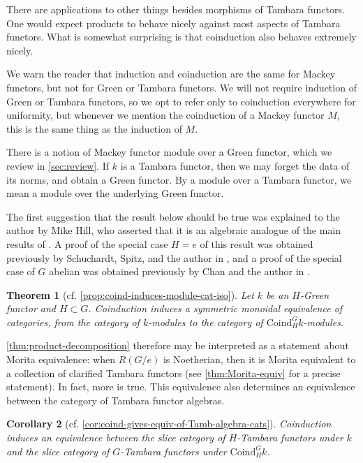 \documentclass[11pt,dvipsnames]{amsart}
\newtheorem{theoremLET}{Theorem}
\newtheorem{corollaryLET}[theoremLET]{Corollary}
\theoremstyle{BoldRemark}
\begin{document}
There are applications to other things besides morphisms of Tambara functors. One would expect products to behave nicely against most aspects of Tambara functors. What is somewhat surprising is that coinduction also behaves extremely nicely.

We warn the reader that induction and coinduction are the same for Mackey functors, but not for Green or Tambara functors. We will not require induction of Green or Tambara functors, so we opt to refer only to coinduction everywhere for uniformity, but whenever we mention the coinduction of a Mackey functor $M$, this is the same thing as the induction of $M$.

There is a notion of Mackey functor module over a Green functor, which we review in \cref{sec:review}. If $k$ is a Tambara functor, then we may forget the data of its norms, and obtain a Green functor. By a module over a Tambara functor, we mean a module over the underlying Green functor. 

The first suggestion that the result below should be true was explained to the author by Mike Hill, who asserted that it is an algebraic analogue of the main results of \cite{BDS15}. A proof of the special case $H = e$ of this result was obtained previously by Schuchardt, Spitz, and the author in \cite{SSW24}, and a proof of the special case of $G$ abelian was obtained previously by Chan and the author in \cite{CW25}.

\begin{theoremLET}[cf. \cref{prop:coind-induces-module-cat-iso}]
	Let $k$ be an $H$-Green functor and $H \subset G$. Coinduction induces a symmetric monoidal equivalence of categories, from the category of $k$-modules to the category of $\mathrm{Coind}_H^G k$-modules.
\end{theoremLET}

\cref{thm:product-decomposition} therefore may be interpreted as a statement about Morita equivalence: when $R(G/e)$ is Noetherian, then it is Morita equivalent to a collection of clarified Tambara functors (see \cref{thm:Morita-equiv} for a precise statement). In fact, more is true. This equivalence also determines an equivalence between the category of Tambara functor algebras.

\begin{corollaryLET}[cf. \cref{cor:coind-gives-equiv-of-Tamb-algebra-cats}]
	Coinduction induces an equivalence between the slice category of $H$-Tambara functors under $k$ and the slice category of $G$-Tambara functors under $\mathrm{Coind}_H^G k$.
\end{corollaryLET}
\end{document}
